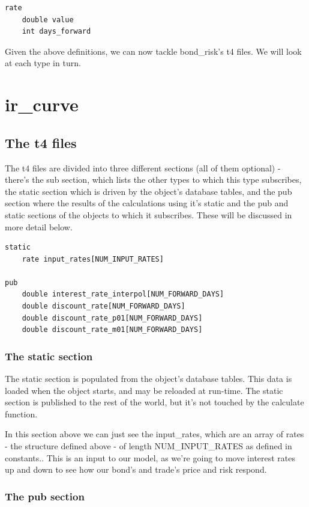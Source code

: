 \documentclass{report}
\begin{document}
\begin{verbatim}
rate
    double value
    int days_forward
\end{verbatim}

Given the above definitions, we can now tackle bond_risk's t4 files. We will look at each type in turn.

\section{ir_curve}

\subsection{The t4 files}

The t4 files are divided into three different sections (all of them optional) - there's the sub section, which lists the other types to which this type subscribes, the static section which is driven by the object's database tables, and the pub section where the results of the calculations using it's static and the pub and static sections of the objects to which it subscribes. These will be discussed in more detail below.

\begin{verbatim}
static
    rate input_rates[NUM_INPUT_RATES]

pub
    double interest_rate_interpol[NUM_FORWARD_DAYS]
    double discount_rate[NUM_FORWARD_DAYS]
    double discount_rate_p01[NUM_FORWARD_DAYS]
    double discount_rate_m01[NUM_FORWARD_DAYS]
\end{verbatim}

\subsubsection{The static section}

The static section is populated from the object's database tables. This data is loaded when the object starts, and may be reloaded at run-time. The static section is published to the rest of the world, but it's not touched by the calculate function.

In this section above we can just see the input_rates, which are an array of rates - the structure defined above - of length NUM_INPUT_RATES as defined in constants.. This is an input to our model, as we're going to move interest rates up and down to see how our bond's and trade's price and risk respond. 

\subsubsection{The pub section}
\end{document}
